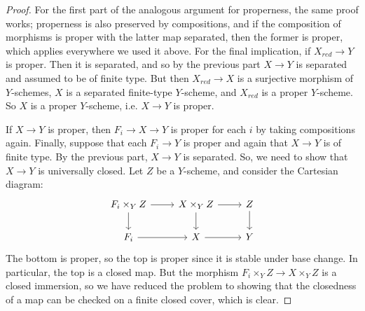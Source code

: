 \begin{proof}
	For the first part of the analogous argument for properness, the same proof works; properness is also preserved by compositions, and if the composition of morphisms is proper with the latter map separated, then the former is proper, which applies everywhere we used it above. For the final implication, if $X_{red} \to Y$ is proper. Then it is separated, and so by the previous part $X \to Y$ is separated and assumed to be of finite type. But then $X_{red} \to X$ is a surjective morphism of $Y$-schemes, $X$ is a separated finite-type $Y$-scheme, and $X_{red}$ is a proper $Y$-scheme. So $X$ is a proper $Y$-scheme, i.e. $X \to Y$ is proper.
	
	If $X \to Y$ is proper, then $F_i \to X \to Y$ is proper for each $i$ by taking compositions again. Finally, suppose that each $F_i \to Y$ is proper and again that $X \to Y$ is of finite type. By the previous part, $X \to Y$ is separated. So, we need to show that $X \to Y$ is universally closed. Let $Z$ be a $Y$-scheme, and consider the Cartesian diagram:
	\[ \begin{tikzcd} F_i \times_Y Z \arrow[r] \arrow[d] & X \times_Y Z \arrow[r] \arrow[d] & Z \arrow[d] \\ F_i \arrow[r] & X \arrow[r] & Y \end{tikzcd} \]
	The bottom is proper, so the top is proper since it is stable under base change. In particular, the top is a closed map. But the morphism $F_i \times_Y Z \to X \times_Y Z$ is a closed immersion, so we have reduced the problem to showing that the closedness of a map can be checked on a finite closed cover, which is clear.
\end{proof}
